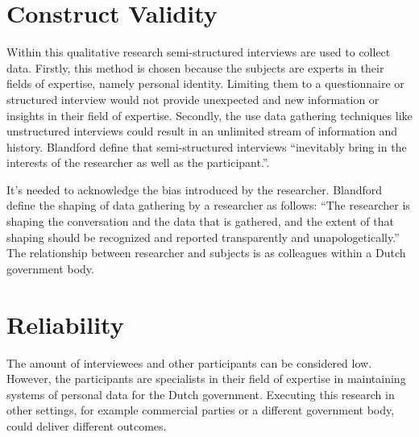 
\section{Construct Validity}
Within this qualitative research semi-structured interviews are used to collect data. Firstly, this method is chosen because the subjects are experts in their fields of expertise, namely personal identity. Limiting them to a questionnaire or structured interview would not provide unexpected and new information or insights in their field of expertise. Secondly, the use data gathering techniques like unstructured interviews could result in an unlimited stream of information and history. Blandford \etal \cite{Blandford2016QualitativeHR} define that semi-structured interviews “inevitably bring in the interests of the researcher as well as the participant.”. 
\par
It’s needed to acknowledge the bias introduced by the researcher. Blandford \etal \cite{Blandford2016QualitativeHR} define the shaping of data gathering by a researcher as follows: “The researcher is shaping the conversation and the data that is gathered, and the extent of that shaping should be recognized and reported transparently and unapologetically.” The relationship between researcher and subjects is as colleagues within a Dutch government body.
\section{Reliability}
The amount of interviewees and other participants can be considered low. However, the participants are specialists in their field of expertise in maintaining systems of personal data for the Dutch government. Executing this research in other settings, for example commercial parties or a different government body, could deliver different outcomes. 

